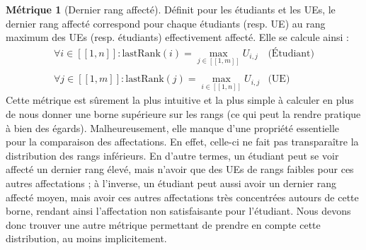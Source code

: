 \documentclass{rapport}
\theoremstyle{definition}
\theoremstyle{remark}
\theoremstyle{definition}
\newtheorem*{metric}{Métrique}
\theoremstyle{remark}
\newcommand{\llbracket}{[\![}
\newcommand{\rrbracket}{]\!]}
\begin{document}
\begin{metric}[Dernier rang affecté]
    Définit pour les étudiants et les UEs, le dernier rang affecté correspond pour chaque étudiants (resp. UE) au rang maximum des UEs (resp. étudiants) effectivement affecté.
    Elle se calcule ainsi :
    $$
    \begin{matrix}
        \forall i\in\llbracket 1, n\rrbracket : \text{lastRank}(i) = \max_{j\in\llbracket 1,m\rrbracket} U_{i,j} & \text{(Étudiant)}\\
        &\\
        \forall j\in\llbracket 1, m\rrbracket : \text{lastRank}(j) = \max_{i\in\llbracket 1,n\rrbracket} U_{i,j} & \text{(UE)}
    \end{matrix}
    $$
    Cette métrique est sûrement la plus intuitive et la plus simple à calculer en plus de nous donner une borne supérieure sur les rangs (ce qui peut la rendre pratique à bien des égards). Malheureusement, elle manque d'une propriété essentielle pour la comparaison des affectations.
    En effet, celle-ci ne fait pas transparaître la distribution des rangs inférieurs. En d'autre termes, un étudiant peut se voir affecté un dernier rang élevé, mais n'avoir que des UEs de rangs faibles pour ces autres affectations ; à l'inverse, un étudiant peut aussi avoir un dernier rang affecté moyen, mais avoir ces autres affectations très concentrées autours de cette borne, rendant ainsi l'affectation non satisfaisante pour l'étudiant.
    Nous devons donc trouver une autre métrique permettant de prendre en compte cette distribution, au moins implicitement.
\end{metric}
\end{document}
